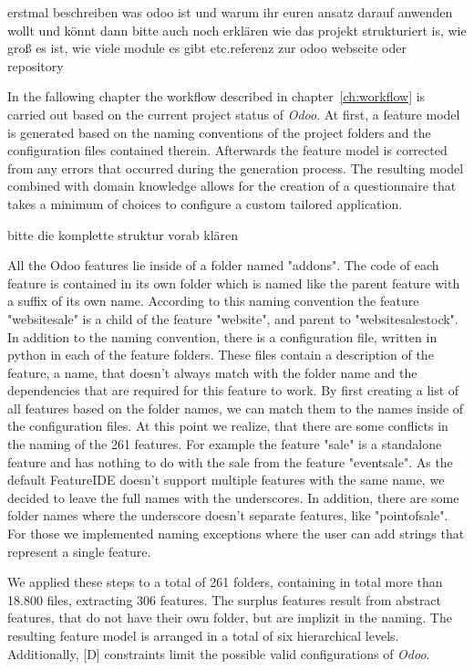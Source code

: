 
{\color{red} erstmal beschreiben was odoo ist und warum ihr euren ansatz darauf anwenden wollt und könnt dann bitte auch noch erklären wie das projekt strukturiert is, wie groß es ist, wie viele module es gibt etc.referenz zur odoo webseite oder repository}

In the fallowing chapter the workflow described in chapter~\ref{ch:workflow} is carried out based on the current project status of \textit{Odoo}. At first, a feature model is generated based on the naming conventions of the project folders and the configuration files contained therein. Afterwards the feature model is corrected from any errors that occurred during the generation process. The resulting model combined with domain knowledge allows for the creation of a questionnaire that takes a minimum of choices to configure a custom tailored application.

{\color{red} bitte die komplette struktur vorab klären}

All the Odoo features lie inside of a folder named "addons". The code of each feature is contained in its own folder which is named like the parent feature with a suffix of its own name. According to this naming convention the feature "website\textunderscore sale" is a child of the feature "website", and parent to "website\textunderscore sale\textunderscore stock". In addition to the naming convention, there is a configuration file, written in python in each of the feature folders. These files contain a description of the feature, a name, that doesn't always match with the folder name and the dependencies that are required for this feature to work.
By first creating a list of all features based on the folder names, we can match them to the names inside of the configuration files. At this point we realize, that there are some conflicts in the naming of the 261 features. For example the feature "sale" is a standalone feature and has nothing to do with the sale from the feature "event\textunderscore sale". As the default FeatureIDE doesn't support multiple features with the same name, we decided to leave the full names with the underscores. In addition, there are some folder names where the underscore doesn't separate features, like "point\textunderscore of\textunderscore sale". For those we implemented naming exceptions where the user can add strings that represent a single feature.

We applied these steps to a total of 261 folders, containing in total more than 18.800 files, extracting 306 features. The surplus features result from abstract features, that do not have their own folder, but are implizit in the naming. The resulting feature model is arranged in a total of six hierarchical levels. Additionally, [D] constraints limit the possible valid configurations of \textit{Odoo}.


